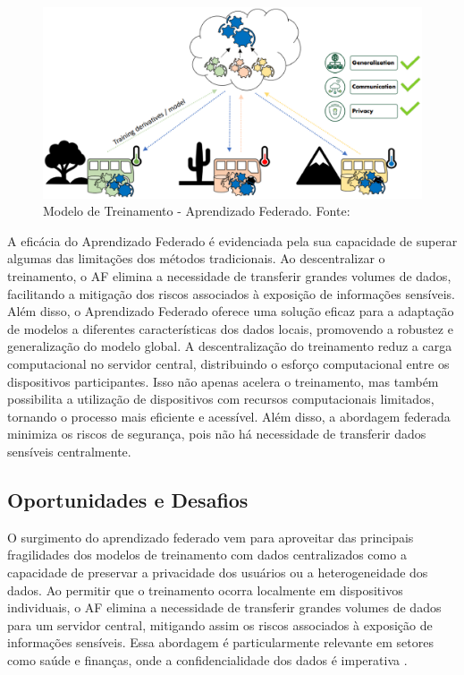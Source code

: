 \begin{figure}[ht]
    \centering
    \includegraphics[scale=0.50]{figuras/FederatedLearning.eps}
    \caption{Modelo de Treinamento - Aprendizado Federado. Fonte: 
    \cite{ekkonoFederatedLearning}}
    \label{fig:FederatedLearning}
\end{figure}

A eficácia do Aprendizado Federado é evidenciada pela sua capacidade de superar algumas das limitações dos métodos tradicionais. Ao descentralizar o treinamento, o AF elimina a necessidade de transferir grandes volumes de dados, facilitando a mitigação dos riscos associados à exposição de informações sensíveis. Além disso, o Aprendizado Federado oferece uma solução eficaz para a adaptação de modelos a diferentes características dos dados locais, promovendo a robustez e generalização do modelo global. A descentralização do treinamento reduz a carga computacional no servidor central, distribuindo o esforço computacional entre os dispositivos participantes\cite{yang2019federated}. Isso não apenas acelera o treinamento, mas também possibilita a utilização de dispositivos com recursos computacionais limitados, tornando o processo mais eficiente e acessível. Além disso, a abordagem federada minimiza os riscos de segurança, pois não há necessidade de transferir dados sensíveis centralmente\cite{bonawitz2019towards}.

\subsection{Oportunidades e Desafios}

O surgimento do aprendizado federado vem para aproveitar das principais fragilidades dos modelos de treinamento com dados centralizados como a capacidade de preservar a privacidade dos usuários ou a heterogeneidade dos dados. Ao permitir que o treinamento ocorra localmente em dispositivos individuais, o AF elimina a necessidade de transferir grandes volumes de dados para um servidor central, mitigando assim os riscos associados à exposição de informações sensíveis. Essa abordagem é particularmente relevante em setores como saúde e finanças, onde a confidencialidade dos dados é imperativa \cite{mcmahan2017communication}.

